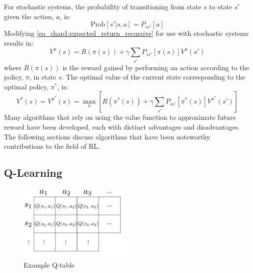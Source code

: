 For stochastic systems, the probability of transitioning from state $s$ to state $s'$ given the action, $a$, is:
%
\begin{equation}
\text{Prob}[s'|s,a]=P_{ss'}[a]
\end{equation}
%
Modifying \eqref{eq_chap1:expected_return_recursive} for use with stochastic systems results in:
%
\begin{equation}
V^{\pi}(s)=R(\pi(s))+\gamma\sum_{s'}P_{ss'}[\pi(s)]V^{\pi}(s')
\label{eq_chap1:Q-learning_value}
\end{equation}
%
where $R(\pi(s))$ is the reward gained by performing an action according to the policy, $\pi$, in state $s$.
%
The optimal value of the current state corresponding to the optimal policy, $\pi^*$, is:
%
\begin{equation}
V^*(s) = V^{\pi^*}(s) = \max_a \left[ R(\pi^*(s))+\gamma\sum_{s'}P_{ss'}[\pi^*(s)]V^{\pi^*}(s')\right]
\label{eq_chap1:Q-learning_op_value}
\end{equation}
%
Many algorithms that rely on using the value function to approximate future reward have been developed, each with distinct advantages and disadvantages. The following sections discuss algorithms that have been noteworthy contributions to the field of RL.


\subsection{Q-Learning}

%
\begin{figure}[tb]
\begin{center}
\includegraphics[width = 0.5\textwidth]{figures/figures_introduction/Q_table.pdf}
\caption{Example Q-table} 
\label{fig_chap1:Q_table}
\end{center}
\end{figure}
%

